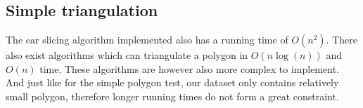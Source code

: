 \subsection{Simple triangulation}
\label{subsec:SimpleTriangulation}
The ear slicing algorithm implemented also has a running time of $O(n^2)$. There also exist algorithms which can triangulate a polygon in $O(n\log(n))$ and $O(n)$ time. These algorithms are however also more complex to implement. And just like for the simple polygon test, our dataset only contains relatively small polygon, therefore longer running times do not form a great constraint.
